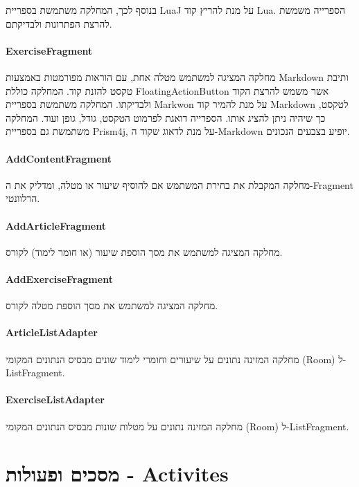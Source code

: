 בנוסף לכך, המחלקה משתמשת בספריית LuaJ על מנת להריץ קוד Lua.
הספרייה משמשת להרצת הפתרונות ולבדיקתם.

\paragraph{ExerciseFragment}

מחלקה המציגה למשתמש מטלה אחת, עם הוראות מפורמטות באמצעות Markdown ותיבת טקסט להזנת קוד.
המחלקה כוללת FloatingActionButton אשר משמש להרצת הקוד ולבדיקתו.
המחלקה משתמשת בספריית Markwon על מנת להמיר קוד Markdown לטקסט, כך שיהיה ניתן להציג אותו.
הספרייה דואגת לפרמוט הטקסט, גודל, גופן ועוד.
המחלקה משתמשת גם בספריית Prism4j, על מנת לדאוג שקוד ה-Markdown יופיע בצבעים הנכונים.


\paragraph{AddContentFragment}

מחלקה המקבלת את בחירת המשתמש אם להוסיף שיעור או מטלה, ומדליק את ה-Fragment הרלוונטי.

\paragraph{AddArticleFragment}

מחלקה המציגה למשתמש את מסך הוספת שיעור (או חומר לימוד) לקורס.

\paragraph{AddExerciseFragment}

מחלקה המציגה למשתמש את מסך הוספת מטלה לקורס.

\paragraph{ArticleListAdapter}

מחלקה המזינה נתונים על שיעורים וחומרי לימוד שונים מבסיס הנתונים המקומי (Room) ל-ListFragment.

\paragraph{ExerciseListAdapter}

מחלקה המזינה נתונים על מטלות שונות מבסיס הנתונים המקומי (Room) ל-ListFragment.

\section{מסכים ופעולות - Activites}

